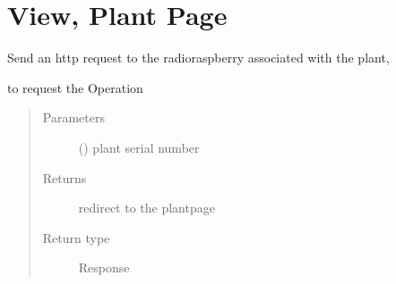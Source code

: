 \documentclass[letterpaper,10pt,english]{sphinxmanual}
\begin{document}
\chapter{View, Plant Page}
\label{\detokenize{index:module-view.plant}}\label{\detokenize{index:view-plant-page}}

\begin{fulllineitems}
\label{\detokenize{index:view.plant.container_state}}
Send an http request to the radio\sphinxhyphen{}raspberry associated with the plant,

to request the  Operation
\begin{quote}\begin{description}
\item[{Parameters}] \leavevmode
{} () \textendash{} plant serial number

\item[{Returns}] \leavevmode
redirect to the plantpage

\item[{Return type}] \leavevmode
Response

\end{description}\end{quote}

\end{fulllineitems}

\end{document}

